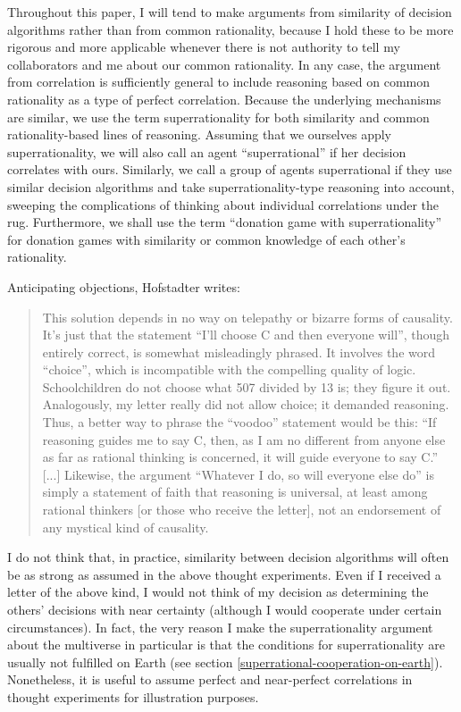 Throughout this paper, I will tend to make arguments from similarity of
decision algorithms rather than from common rationality, because I hold
these to be more rigorous and more applicable whenever there is not
authority to tell my collaborators and me about our common rationality.
In any case, the argument from correlation is sufficiently general to
include reasoning based on common rationality as a type of perfect
correlation. Because the underlying mechanisms are similar, we use the
term superrationality for both similarity and common rationality-based
lines of reasoning. Assuming that we ourselves apply superrationality,
we will also call an agent ``superrational'' if her decision correlates
with ours. Similarly, we call a group of agents superrational if they
use similar decision algorithms and take superrationality-type reasoning
into account, sweeping the complications of thinking about individual
correlations under the rug. Furthermore, we shall use the term
``donation game with superrationality'' for donation games with
similarity or common knowledge of each other's rationality.

Anticipating objections, Hofstadter
\parencite{Hofstadter1983-az} writes:

\begin{quote}
This solution depends in no way on telepathy or bizarre forms of
causality. It's just that the statement ``I'll choose C and then everyone
will'', though entirely correct, is somewhat misleadingly phrased. It
involves the word ``choice'', which is incompatible with the compelling
quality of logic. Schoolchildren do not choose what 507 divided by 13
is; they figure it out. Analogously, my letter really did not allow
choice; it demanded reasoning. Thus, a better way to phrase the ``voodoo''
statement would be this: ``If reasoning guides me to say C, then, as I am
no different from anyone else as far as rational thinking is concerned,
it will guide everyone to say C.'' {[}...{]} Likewise, the argument
``Whatever I do, so will everyone else do'' is simply a statement of faith
that reasoning is universal, at least among rational thinkers {[}or
those who receive the letter{]}, not an endorsement of any mystical kind
of causality.
\end{quote}

I do not think that, in practice, similarity between decision algorithms
will often be as strong as assumed in the above thought experiments.
Even if I received a letter of the above kind, I would not think of my
decision as determining the others' decisions with near certainty
(although I would cooperate under certain circumstances). In fact, the
very reason I make the superrationality argument about the multiverse in
particular is that the conditions for superrationality are usually not
fulfilled on Earth (see section
\ref{superrational-cooperation-on-earth}). Nonetheless, it is useful to assume perfect
and near-perfect correlations in thought experiments for illustration
purposes.

